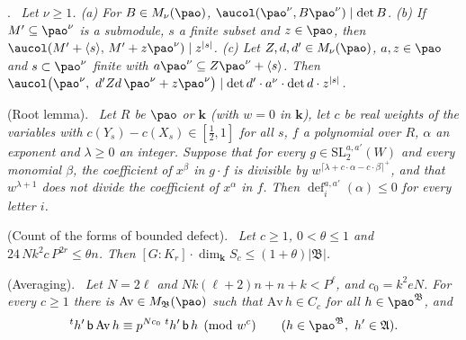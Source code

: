 \documentclass[10pt]{amsart}
\theoremstyle{definition}
\theoremstyle{remark}
\providecommand{\phA}{\mathfrak A}
\providecommand{\phB}{\mathfrak B}
\providecommand{\phdef}{\operatorname{def}}
\providecommand{\phk}{\boldsymbol k}
\newenvironment{quotedthm}[2]{\par\medskip\noindent\begingroup
  \textbf{#1}#2.\ \itshape\ignorespaces}{\endgroup\par\medskip}
\begin{document}
\begin{quotedthm}{\cite[Lemma~2.3]{P50}}{}
Let $\nu\ge1$. {\rm(a)} For $B\in M_\nu(\pao)$, $\aucol(\pao^\nu,B\pao^\nu)\mid\det B$.
{\rm(b)} If $M'\subseteq\pao^\nu$ is a submodule, $s$ a finite subset and $z\in\pao$, then
$\aucol(M'+\langle s\rangle,\,M'+z\pao^\nu)\mid z^{|s|}$.
{\rm(c)} Let $Z,d,d'\in M_\nu(\pao)$, $a,z\in\pao$ and $s\subset\pao^\nu$ finite with
$a\pao^\nu\subseteq Z\pao^\nu+\langle s\rangle$. Then
$\aucol\bigl(\pao^\nu,\ d'Zd\,\pao^\nu+z\pao^\nu\bigr)\mid\det d'\cdot a^\nu\cdot\det d\cdot
z^{|s|}$.
\end{quotedthm}

\begin{quotedthm}{\cite[Proposition~2.10]{P50}}{ (Root lemma)}
Let $R$ be $\pao$ or $\phk$ (with $w=0$ in $\phk$), let $c$ be real weights of the variables with
$c(Y_s)-c(X_s)\in[\tfrac12,1]$ for all $s$, $f$ a polynomial over $R$, $\alpha$ an exponent and
$\lambda\ge0$ an integer. Suppose that for every $g\in\mathrm{SL}_2^{a,a'}(W)$ and every monomial
$\beta$, the coefficient of $x^\beta$ in $g\cdot f$ is divisible by $w^{\lceil\lambda+c\cdot\alpha
-c\cdot\beta\rceil^+}$, and that $w^{\lambda+1}$ does not divide the coefficient of $x^\alpha$ in
$f$. Then $\phdef_i^{a,a'}(\alpha)\le0$ for every letter $i$.
\end{quotedthm}

\begin{quotedthm}{\cite[Proposition~2.12]{P50}}{ (Count of the forms of bounded defect)}
Let $c\ge1$, $0<\theta\le1$ and $24\,Nk^2c\,P^{2r}\le\theta n$. Then
$[G:K_r]\cdot\dim_{\phk} S_c\le(1+\theta)|\phB|$.
\end{quotedthm}

\begin{quotedthm}{\cite[Proposition~2.13]{P50}}{ (Averaging)}
Let $N=2\ell$ and $Nk(\ell+2)n+n+k<P^\ell$, and $c_0=k^2eN$. For every $c\ge1$ there is
$\mathrm{Av}\in M_\phB(\pao)$ such that $\mathrm{Av}\,h\in C_c$ for all $h\in\pao^\phB$, and
\[
{}^th'\,\mathsf b\,\mathrm{Av}\,h\equiv p^{Nc_0}\;{}^th'\,\mathsf b\,h\pmod{w^c}\qquad(h\in
\pao^\phB,\ h'\in\phA).
\]
\end{quotedthm}
\end{document}
